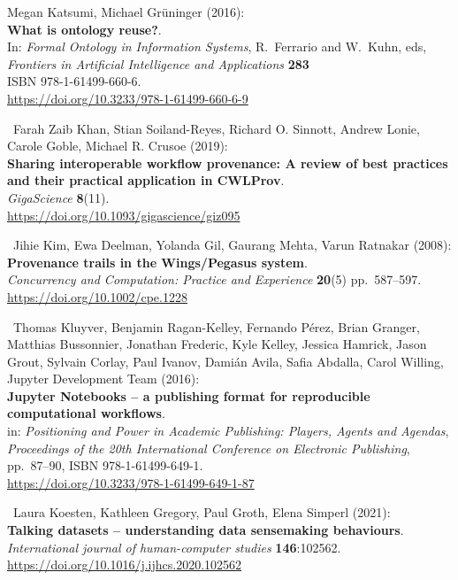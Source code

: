 \begin{thebibliography}{9}
 Megan Katsumi, Michael Grüninger (2016):\\
\textbf{What is ontology reuse?}.\\
In: \emph{Formal Ontology in Information Systems}, R.~Ferrario and
W.~Kuhn, eds,\\
\emph{Frontiers in Artificial Intelligence and Applications}
\textbf{283}\\
ISBN 978-1-61499-660-6.\\
\url{https://doi.org/10.3233/978-1-61499-660-6-9}

~Farah Zaib Khan, Stian Soiland-Reyes, Richard O. Sinnott,
Andrew Lonie, Carole Goble, Michael R. Crusoe (2019):\\
\textbf{Sharing interoperable workflow provenance: A review of best
practices and their practical application in CWLProv}.\\
\emph{GigaScience} \textbf{8}(11).\\
\url{https://doi.org/10.1093/gigascience/giz095}

~Jihie Kim, Ewa Deelman, Yolanda Gil, Gaurang Mehta, Varun
Ratnakar (2008):\\
\textbf{Provenance trails in the Wings/Pegasus system}.\\
\emph{Concurrency and Computation: Practice and Experience}
\textbf{20}(5) pp.~587--597.\\
\url{https://doi.org/10.1002/cpe.1228}

~Thomas Kluyver, Benjamin Ragan-Kelley, Fernando Pérez, Brian
Granger, Matthias Bussonnier, Jonathan Frederic, Kyle Kelley, Jessica
Hamrick, Jason Grout, Sylvain Corlay, Paul Ivanov, Damián Avila, Safia
Abdalla, Carol Willing, Jupyter Development Team (2016):\\
\textbf{Jupyter Notebooks -- a publishing format for reproducible
computational workflows}.\\
in: \emph{Positioning and Power in Academic Publishing: Players, Agents
and Agendas},\\
\emph{Proceedings of the 20th International Conference on Electronic
Publishing}, pp.~87--90, ISBN 978-1-61499-649-1.\\
\url{https://doi.org/10.3233/978-1-61499-649-1-87}

~Laura Koesten, Kathleen Gregory, Paul Groth, Elena Simperl
(2021):\\
\textbf{Talking datasets -- understanding data sensemaking
behaviours}.\\
\emph{International journal of human-computer studies}
\textbf{146}:102562.\\
\url{https://doi.org/10.1016/j.ijhcs.2020.102562}


\end{thebibliography}

